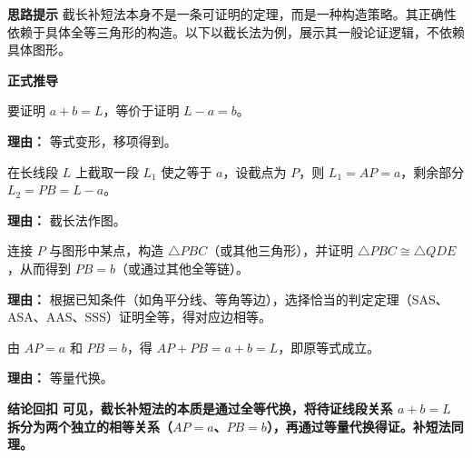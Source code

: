 \begin{proofbox}
	\textbf{\textcolor{CProof}{思路提示}}
	截长补短法本身不是一条可证明的定理，而是一种构造策略。其正确性依赖于具体全等三角形的构造。以下以截长法为例，展示其一般论证逻辑，不依赖具体图形。

	\medskip
	\textbf{\textcolor{CProof}{正式推导}}
	\begin{description}[style=nextline, leftmargin=2.8em, labelsep=0.5em, itemsep=0.55em]
		\item[\textbf{步骤一（目标转化）：}]
			要证明 $a+b=L$，等价于证明 $L-a = b$。
			\par\textbf{理由：} 等式变形，移项得到。
		\item[\textbf{步骤二（取点分线）：}]
			在长线段 $L$ 上截取一段 $L_1$ 使之等于 $a$，设截点为 $P$，则 $L_1 = AP = a$，剩余部分 $L_2 = PB = L-a$。
			\par\textbf{理由：} 截长法作图。
		\item[\textbf{步骤三（全等代换）：}]
			连接 $P$ 与图形中某点，构造 $\triangle PBC$（或其他三角形），并证明 $\triangle PBC \cong \triangle QDE$，从而得到 $PB = b$（或通过其他全等链）。
			\par\textbf{理由：} 根据已知条件（如角平分线、等角等边），选择恰当的判定定理（SAS、ASA、AAS、SSS）证明全等，得对应边相等。
		\item[\textbf{步骤四（合并结果）：}]
			由 $AP=a$ 和 $PB=b$，得 $AP+PB = a+b = L$，即原等式成立。
			\par\textbf{理由：} 等量代换。
	\end{description}

	\medskip
	\textbf{\textcolor{CProof}{结论回扣}}
	\textbf{可见，截长补短法的本质是通过全等代换，将待证线段关系 $a+b=L$ 拆分为两个独立的相等关系（$AP=a$、$PB=b$），再通过等量代换得证。补短法同理。}
\end{proofbox}
